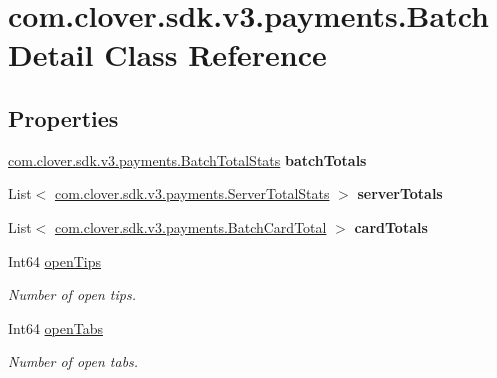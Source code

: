 \hypertarget{classcom_1_1clover_1_1sdk_1_1v3_1_1payments_1_1_batch_detail}{}\section{com.\+clover.\+sdk.\+v3.\+payments.\+Batch\+Detail Class Reference}
\label{classcom_1_1clover_1_1sdk_1_1v3_1_1payments_1_1_batch_detail}
\subsection*{Properties}
\begin{DoxyCompactItemize}
\item 
\mbox{\label{classcom_1_1clover_1_1sdk_1_1v3_1_1payments_1_1_batch_detail_aa4eedeba3c3089309aea780ec366f1de}} 
\hyperlink{classcom_1_1clover_1_1sdk_1_1v3_1_1payments_1_1_batch_total_stats}{com.\+clover.\+sdk.\+v3.\+payments.\+Batch\+Total\+Stats} {\bfseries batch\+Totals}
\item 
\mbox{\label{classcom_1_1clover_1_1sdk_1_1v3_1_1payments_1_1_batch_detail_a5f60c0db6c1d97e3f3776fabbf05429d}} 
List$<$ \hyperlink{classcom_1_1clover_1_1sdk_1_1v3_1_1payments_1_1_server_total_stats}{com.\+clover.\+sdk.\+v3.\+payments.\+Server\+Total\+Stats} $>$ {\bfseries server\+Totals}
\item 
\mbox{\label{classcom_1_1clover_1_1sdk_1_1v3_1_1payments_1_1_batch_detail_a4ec6864a0a6ad50a8c4be67f6b4a14d1}} 
List$<$ \hyperlink{classcom_1_1clover_1_1sdk_1_1v3_1_1payments_1_1_batch_card_total}{com.\+clover.\+sdk.\+v3.\+payments.\+Batch\+Card\+Total} $>$ {\bfseries card\+Totals}
\item 
Int64 \hyperlink{classcom_1_1clover_1_1sdk_1_1v3_1_1payments_1_1_batch_detail_a81b8732afda13d6df5de5ef93aa05f47}{open\+Tips}
\begin{DoxyCompactList}\small\item\em Number of open tips. \end{DoxyCompactList}\item 
Int64 \hyperlink{classcom_1_1clover_1_1sdk_1_1v3_1_1payments_1_1_batch_detail_a31e7d8d50ee2df7c1373e0ff0412c7dc}{open\+Tabs}
\begin{DoxyCompactList}\small\item\em Number of open tabs. \end{DoxyCompactList}\end{DoxyCompactItemize}


